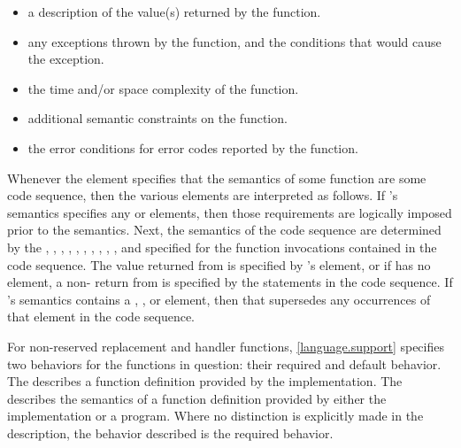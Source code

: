 \begin{itemize}
\item
\returns a description of the value(s) returned by the function.

\item
\throws any exceptions thrown by the function, and the conditions that would cause the exception.

\item
\complexity the time and/or space complexity of the function.

\item
\remarks additional semantic constraints on the function.

\item
\errors the error conditions for error codes reported by the function.
\end{itemize}

\pnum
Whenever the  element specifies that the semantics of some function
 are  some code sequence, then the various elements are
interpreted as follows.
If 's semantics specifies any  or  elements,
then those requirements are logically imposed prior to the  semantics.
Next, the semantics of the code sequence are determined by the
, , , ,
, , , ,
, , and 
specified for the function invocations contained in the code sequence.
The value returned from  is specified by 's  element,
or if  has no  element,
a non- return from  is specified by the
 statements in the code sequence.
If 's semantics contains a ,
, or  element,
then that supersedes any occurrences of that element in the code sequence.

\pnum
For non-reserved replacement and handler functions,
\ref{language.support} specifies two behaviors for the functions in question:
their required and default behavior.
The 
describes a function definition provided by the implementation.
The 
describes the semantics of a function definition provided by
either the implementation or a \Cpp{} program.
Where no distinction is explicitly made in the description, the
behavior described is the required behavior.

